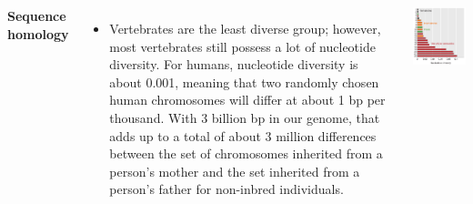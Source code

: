 \documentclass[11pt,dvipsnames,ignorenonframetext,aspectratio=169]{beamer}
\begin{document}
\begin{frame}{}
\protect\hypertarget{section-3}{}
\begin{columns}

\textbf{\Large Sequence homology}
\begin{itemize}
\footnotesize
\item Vertebrates are the least diverse group; however, most vertebrates still possess a lot of nucleotide diversity. For humans, nucleotide diversity is about 0.001, meaning that two randomly chosen human chromosomes will differ at about 1 bp per thousand. With 3 billion bp in our genome, that adds up to a total of about 3 million differences between the set of chromosomes inherited from a person's mother and the set inherited from a person's father for non-inbred individuals.
\end{itemize}


\begin{center}\includegraphics[width=0.36\linewidth]{../images/nucleotide_diversity_organisms} \end{center}



\end{columns}
\end{frame}
\end{document}

